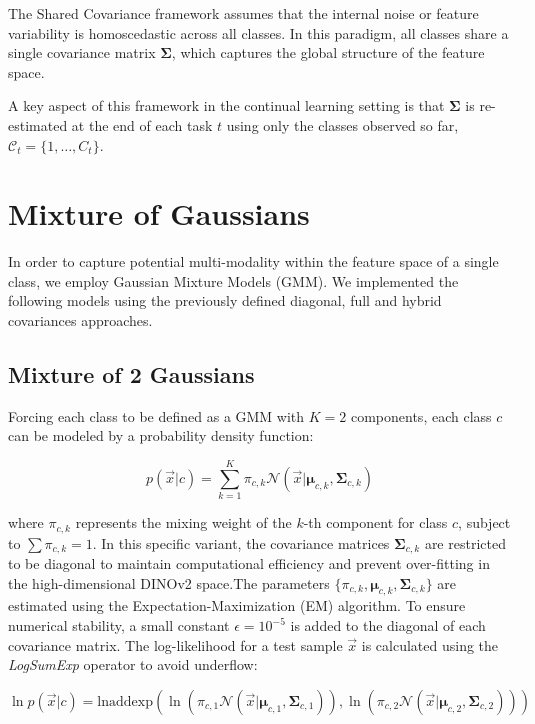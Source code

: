 The Shared Covariance framework assumes that the internal noise or feature variability is homoscedastic across all classes. In this paradigm, all classes share a single covariance matrix $\boldsymbol{\Sigma}$, which captures the global structure of the feature space.

A key aspect of this framework in the continual learning setting is that $\boldsymbol{\Sigma}$ is re-estimated at the end of each task $t$ using only the classes observed so far, $\mathcal{C}_t = \{1, \dots, C_t\}$.

\section{Mixture of Gaussians}

In order to capture potential multi-modality within the feature space of a single class, we employ Gaussian Mixture Models (GMM). We implemented the following models using the previously defined diagonal, full and hybrid covariances approaches.

\subsection{Mixture of 2 Gaussians}

Forcing each class to be defined as a GMM with $K=2$ components, each class $c$ can be modeled by a probability density function:

\begin{equation}
	p(\vec{x}|c) = \sum_{k=1}^{K} \pi_{c,k} \mathcal{N}(\vec{x} | \boldsymbol{\mu}_{c,k}, \boldsymbol{\Sigma}_{c,k})
\end{equation}

where $\pi_{c,k}$ represents the mixing weight of the $k$-th component for class $c$, subject to $\sum \pi_{c,k} = 1$. In this specific variant, the covariance matrices $\boldsymbol{\Sigma}_{c,k}$ are restricted to be diagonal to maintain computational efficiency and prevent over-fitting in the high-dimensional DINOv2 space.The parameters $\{\pi_{c,k}, \boldsymbol{\mu}_{c,k}, \boldsymbol{\Sigma}_{c,k}\}$ are estimated using the Expectation-Maximization (EM) algorithm. To ensure numerical stability, a small constant $\epsilon = 10^{-5}$ is added to the diagonal of each covariance matrix. The log-likelihood for a test sample $\vec{x}$ is calculated using the \textit{LogSumExp} operator to avoid underflow:

\begin{equation}
	\ln p(\vec{x}|c) = \text{lnaddexp} \left( \ln(\pi_{c,1} \mathcal{N}(\vec{x} | \boldsymbol{\mu}_{c,1}, \boldsymbol{\Sigma}_{c,1})), \ln(\pi_{c,2} \mathcal{N}(\vec{x} | \boldsymbol{\mu}_{c,2}, \boldsymbol{\Sigma}_{c,2})) \right)
\end{equation}

